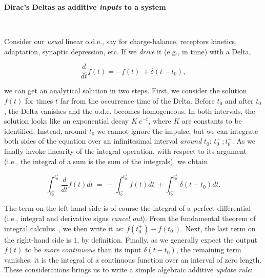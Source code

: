 \newpage
\begin{svgraybox}
	{\bf{Dirac's Deltas as additive \textit{inputs} to a system}}
	\\
		\begin{center}
		\
	\end{center}	
	Consider our \textit{usual} linear o.d.e., say for charge-balance, receptors kinetics, adaptation, synaptic depression, etc. If we \textit{drive} it (e.g., in time) with a Delta, 

	\begin{equation}
		\frac{d}{dt}f(t) = - f(t)\ + \delta(t - t_0),
	\end{equation}

	we can get an analytical solution in two steps. First, we consider the solution \(f(t)\) for times \(t\) far from the occurrence time of the Delta. Before \(t_0\) and after \(t_0\), the Delta vanishes and the o.d.e. becomes homogeneous. In both intervals, the solution looks like an exponential decay \(K\ e^ { - t}\), where \(K\) are constants to be identified. Instead, around \(t_0\) we cannot ignore the impulse, but we can integrate both sides of the equation over an infinitesimal interval \textit{around} \(t_0\):  \(t_0^ -\,  ; t_0^+ \). As we finally invoke linearity of the integral operation, with respect to its argument (i.e., the integral of a sum is the sum of the integrals), we obtain

	\begin{equation}
		\int_{t_0^-}^{t_0^ +} \frac{d}{dt}f(t) dt\ =\ - \int_{t_0^-}^{t_0^ +} f(t) dt\ + \int_{t_0^-}^{t_0^ +} \delta(t - t_0) dt.
	\end{equation}

	The term on the left-hand side is of course the integral of a perfect differential (i.e., integral and derivative signs \textit{cancel out}). From the fundamental theorem of integral calculus~\cite{ThompsonGardner:1998}, we then write it as: \(f(t_0^+) - f(t_0^-)\). Next, the last term on the right-hand side is \(1\), by definition. Finally, as we generally expect the output \(f(t)\) to be \textit{more continuous} than its input \(\delta(t - t_0)\), the remaining term vanishes: it is the integral of a continuous function over an interval of zero length. These considerations brings us to write a simple algebraic additive \textit{update rule}:
	

\end{svgraybox}
